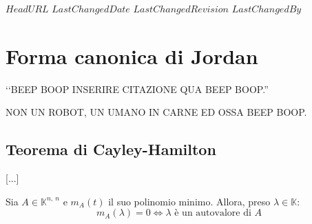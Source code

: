 \svnidlong
{$HeadURL$}
{$LastChangedDate$}
{$LastChangedRevision$}
{$LastChangedBy$}

\chapter{Forma canonica di Jordan}

\begin{introduction}
	‘‘BEEP BOOP INSERIRE CITAZIONE QUA BEEP BOOP.''
	\begin{flushright}
		\textsc{NON UN ROBOT,} UN UMANO IN CARNE ED OSSA BEEP BOOP.
	\end{flushright}
\end{introduction}

\section{Teorema di Cayley-Hamilton}
[...]\\
\begin{theorema}
	Sia $A\in \mathbb{K}^{n,\ n}$ e $m_A\left(t\right)$ il suo polinomio minimo. Allora, preso $\lambda\in\mathbb{K}$:
	\begin{equation}
		m_A\left(\lambda\right)=0\iff \lambda\text{ è un autovalore di }A
	\end{equation}
\vspace{-6mm}
\end{theorema}
